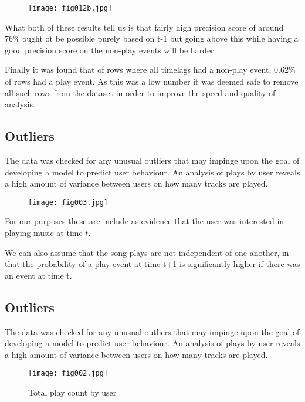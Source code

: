 \begin{figure}[h!]
	\centering
	\texttt{[image: fig012b.jpg]}
	\caption{}
	\label{fig12b}
\end{figure} 

What both of these results tell us is that fairly high precision score of around 76\% ought ot be possible purely based on t-1 but going above this while having a good precision score on the non-play events will be harder.

Finally it was found that of rows where all timelags had a non-play event, 0.62\% of rows had a play event. As this was a low number it was deemed safe to remove all such rows from the dataset in order to improve the speed and quality of analysis. 

\subsection{Outliers}

The data was checked for any unusual outliers that may impinge upon the goal of developing a model to predict user behaviour. An analysis of plays by user reveals a high amount of variance between users on how many tracks are played. 

\begin{figure}[h!]
	\centering
	\texttt{[image: fig003.jpg]}
	\caption{}
	\label{3d}
\end{figure} 

For our purposes these are include as evidence that the user was interested in playing music at time $t$.

We can also assume that the song plays are not independent of one another, in that the probability of a play event at time t+1 is significantly higher if there was an event at time t. 


\subsection{Outliers}

The data was checked for any unusual outliers that may impinge upon the goal of developing a model to predict user behaviour. An analysis of plays by user reveals a high amount of variance between users on how many tracks are played. 

\begin{figure}[h!]
	\centering
	\texttt{[image: fig002.jpg]}
	\caption{Total play count by user}
	\label{fig2}
\end{figure} 



